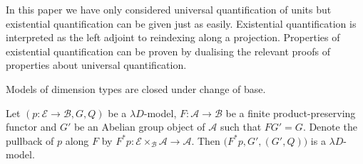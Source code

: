 \documentclass[a4paper,UKenglish]{lipics}
\newcommand{\ra}{\rightarrow}
\newcommand{\A}{\mathcal{A}}
\newcommand{\B}{\mathcal{B}}
\newcommand{\E}{\mathcal{E}}
\newcommand{\blank}{\, \underline{\hspace{2mm}} \,}
\newcommand{\bbracket}[1]{\bigl( #1 \bigr)}
\begin{document}
\begin{remark}
In this paper we have only considered universal quantification of units but existential quantification can be given just as easily. Existential quantification is interpreted as the left adjoint to reindexing along a projection. Properties of  existential quantification can be proven by dualising the relevant proofs of properties about universal quantification.
\end{remark}

%

Models of dimension types are closed under change of base.
\begin{theorem}
Let $(p: \E \ra \B, G, Q)$ be a $\lambda D$-model, $F:\A \ra \B$ be a finite product-preserving functor and $G'$ be an Abelian group object of $\A$ such that $FG' = G$.  Denote the pullback of $p$ along $F$ by $F^\ast p : \E\times_\B\A \rightarrow \A$. Then $\bbracket{F^{\ast}p, G', (G',Q)}$ is a $\lambda D$-model.
\end{theorem}
\end{document}
